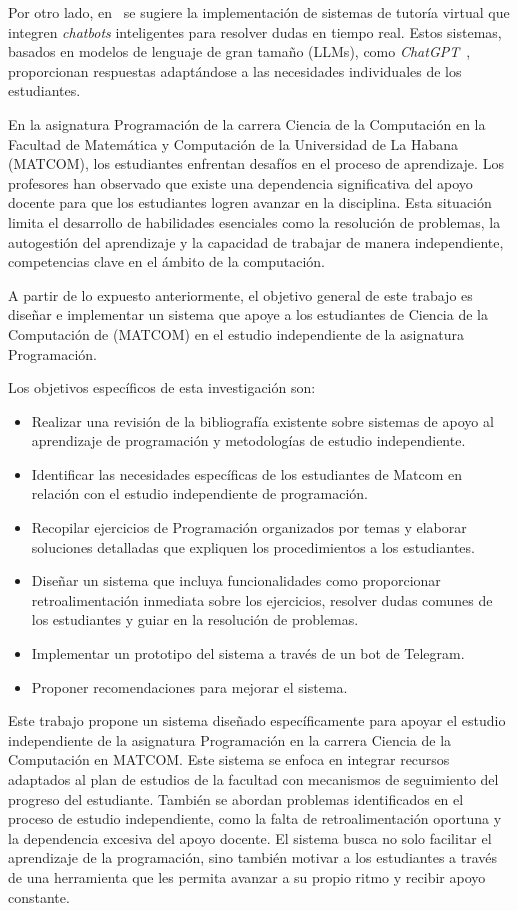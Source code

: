 Por otro lado, en~\cite{dong2025buildaitutoradapt} se sugiere la implementación de sistemas de tutoría virtual que integren \textit{chatbots} inteligentes para resolver dudas en tiempo real. Estos sistemas, basados en modelos de lenguaje de gran tamaño (LLMs), como \textit{ChatGPT}~\cite{chatgpt}, proporcionan respuestas adaptándose a las necesidades individuales de los estudiantes.

En la asignatura Programación de la carrera Ciencia de la Computación en la Facultad de Matemática y Computación de la Universidad de La Habana (\mbox{MATCOM}), los estudiantes enfrentan desafíos en el proceso de aprendizaje. Los profesores han observado que existe una dependencia significativa del apoyo docente para que los estudiantes logren avanzar en la disciplina. Esta situación limita el desarrollo de habilidades esenciales como la resolución de problemas, la autogestión del aprendizaje y la capacidad de trabajar de manera independiente, competencias clave en el ámbito de la computación.

A partir de lo expuesto anteriormente, el objetivo general de este trabajo es diseñar e implementar un sistema que apoye a los estudiantes de Ciencia de la Computación de (\mbox{MATCOM}) en el estudio independiente de la asignatura Programación.

Los objetivos específicos de esta investigación son:
\begin{itemize}
    \item Realizar una revisión de la bibliografía existente sobre sistemas de apoyo al aprendizaje de programación y metodologías de estudio independiente.
    \item Identificar las necesidades específicas de los estudiantes de Matcom en relación con el estudio independiente de programación.
    \item Recopilar ejercicios de Programación organizados por temas y elaborar soluciones detalladas que expliquen los procedimientos a los estudiantes.
    \item Diseñar un sistema que incluya funcionalidades como proporcionar retroalimentación inmediata sobre los ejercicios, resolver dudas comunes de los estudiantes y guiar en la resolución de problemas.
    \item Implementar un prototipo del sistema a través de un bot de Telegram.
    \item Proponer recomendaciones para mejorar el sistema.
\end{itemize}

Este trabajo propone un sistema diseñado específicamente para apoyar el estudio independiente de la asignatura Programación en la carrera Ciencia de la Computación en \mbox{MATCOM}. Este sistema se enfoca en integrar recursos adaptados al plan de estudios de la facultad con mecanismos de seguimiento del progreso del estudiante. También se abordan problemas identificados en el proceso de estudio independiente, como la falta de retroalimentación oportuna y la dependencia excesiva del apoyo docente. El sistema busca no solo facilitar el aprendizaje de la programación, sino también motivar a los estudiantes a través de una herramienta que les permita avanzar a su propio ritmo y recibir apoyo constante.

